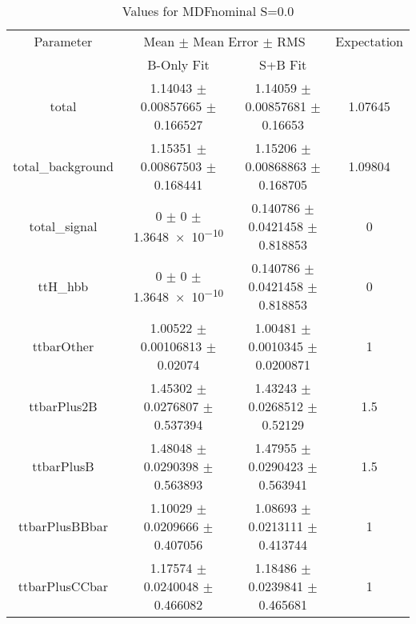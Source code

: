 \begin{table}
\centering
\caption{Values for MDFnominal S=0.0}
\begin{tabular}{cccc}
\toprule
Parameter & \multicolumn{2}{c}{Mean $\pm$ Mean Error $\pm$ RMS} & Expectation\\
 & B-Only Fit & S+B Fit & \\
\midrule
total & \num{1.14043} $\pm$ \num{0.00857665} $\pm$ \num{0.166527} & \num{1.14059} $\pm$ \num{0.00857681} $\pm$ \num{0.16653} & \num{1.07645}\\
total\_background & \num{1.15351} $\pm$ \num{0.00867503} $\pm$ \num{0.168441} & \num{1.15206} $\pm$ \num{0.00868863} $\pm$ \num{0.168705} & \num{1.09804}\\
total\_signal & \num{0} $\pm$ \num{0} $\pm$ \num{1.3648e-10} & \num{0.140786} $\pm$ \num{0.0421458} $\pm$ \num{0.818853} & \num{0}\\
ttH\_hbb & \num{0} $\pm$ \num{0} $\pm$ \num{1.3648e-10} & \num{0.140786} $\pm$ \num{0.0421458} $\pm$ \num{0.818853} & \num{0}\\
ttbarOther & \num{1.00522} $\pm$ \num{0.00106813} $\pm$ \num{0.02074} & \num{1.00481} $\pm$ \num{0.0010345} $\pm$ \num{0.0200871} & \num{1}\\
ttbarPlus2B & \num{1.45302} $\pm$ \num{0.0276807} $\pm$ \num{0.537394} & \num{1.43243} $\pm$ \num{0.0268512} $\pm$ \num{0.52129} & \num{1.5}\\
ttbarPlusB & \num{1.48048} $\pm$ \num{0.0290398} $\pm$ \num{0.563893} & \num{1.47955} $\pm$ \num{0.0290423} $\pm$ \num{0.563941} & \num{1.5}\\
ttbarPlusBBbar & \num{1.10029} $\pm$ \num{0.0209666} $\pm$ \num{0.407056} & \num{1.08693} $\pm$ \num{0.0213111} $\pm$ \num{0.413744} & \num{1}\\
ttbarPlusCCbar & \num{1.17574} $\pm$ \num{0.0240048} $\pm$ \num{0.466082} & \num{1.18486} $\pm$ \num{0.0239841} $\pm$ \num{0.465681} & \num{1}\\
\bottomrule
\end{tabular}
\end{table}